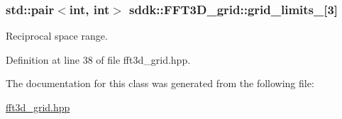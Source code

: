\subsubsection[{grid\+\_\+limits\+\_\+}]{\setlength{\rightskip}{0pt plus 5cm}std\+::pair$<$int, int$>$ sddk\+::\+F\+F\+T3\+D\+\_\+grid\+::grid\+\_\+limits\+\_\+\mbox{[}3\mbox{]}\hspace{0.3cm}{\ttfamily [private]}}\label{classsddk_1_1_f_f_t3_d__grid_a41c9d4dfef43df42e0aa18597f5d83a2}


Reciprocal space range. 



Definition at line 38 of file fft3d\+\_\+grid.\+hpp.



The documentation for this class was generated from the following file\+:\begin{DoxyCompactItemize}
\item 
\hyperlink{fft3d__grid_8hpp}{fft3d\+\_\+grid.\+hpp}\end{DoxyCompactItemize}
